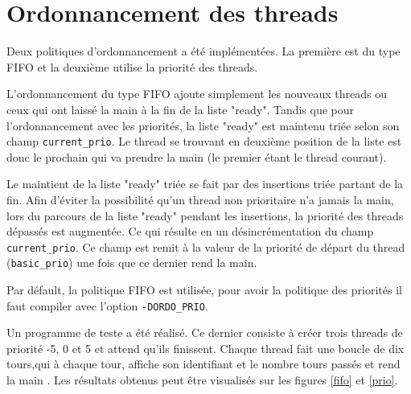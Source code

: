 \section{Ordonnancement des threads}
Deux politiques d'ordonnancement a été implémentées.  La première est
du type FIFO et la deuxième utilise la priorité des threads.

L'ordonnancement du type FIFO ajoute simplement les nouveaux threads
ou ceux qui ont laissé la main à la fin de la liste "ready".  Tandis
que pour l'ordonnancement avec les priorités, la liste "ready" est
maintenu triée selon son champ \verb'current_prio'. Le thread se
trouvant en deuxième position de la liste est donc le prochain qui va
prendre la main (le premier étant le thread courant).

Le maintient de la liste "ready" triée se fait par des insertions
triée partant de la fin. Afin d'éviter la possibilité qu'un thread non
prioritaire n'a jamais la main, lors du parcours de la liste "ready"
pendant les insertions, la priorité des threads dépassés est
augmentée. Ce qui résulte en un désincrémentation du champ
\verb'current_prio'. Ce champ est remit à la valeur de la priorité de
départ du thread (\verb'basic_prio') une fois que ce dernier rend la
main.
 
Par défault, la politique FIFO est utilisée, pour avoir la politique
des priorités il faut compiler avec l'option \verb'-DORDO_PRIO'.

Un programme de teste a été réalisé. Ce dernier consiste à créer trois
threads de priorité -5, 0 et 5 et attend qu'ils finissent. Chaque
thread fait une boucle de dix tours,qui à chaque tour, affiche son
identifiant et le nombre tours passés et rend la main . Les résultats
obtenus peut être visualisés sur les figures \ref{fifo} et \ref{prio}.

